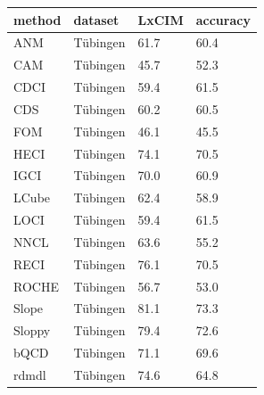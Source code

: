 \begin{tabular}{llll}
\toprule
method & dataset & LxCIM & accuracy \\
\midrule
ANM & Tübingen & 61.7 & 60.4 \\
CAM & Tübingen & 45.7 & 52.3 \\
CDCI & Tübingen & 59.4 & 61.5 \\
CDS & Tübingen & 60.2 & 60.5 \\
FOM & Tübingen & 46.1 & 45.5 \\
HECI & Tübingen & 74.1 & 70.5 \\
IGCI & Tübingen & 70.0 & 60.9 \\
LCube & Tübingen & 62.4 & 58.9 \\
LOCI & Tübingen & 59.4 & 61.5 \\
NNCL & Tübingen & 63.6 & 55.2 \\
RECI & Tübingen & 76.1 & 70.5 \\
ROCHE & Tübingen & 56.7 & 53.0 \\
Slope & Tübingen & 81.1 & 73.3 \\
Sloppy & Tübingen & 79.4 & 72.6 \\
bQCD & Tübingen & 71.1 & 69.6 \\
rdmdl & Tübingen & 74.6 & 64.8 \\
\bottomrule
\end{tabular}
